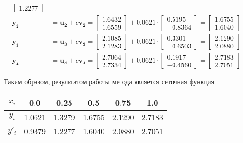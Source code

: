 \documentclass[a4paper, 12pt]{article}
\begin{document}
\begin{enumerate}
\begin{align*}
\begin{bmatrix}
					1.2277
				\end{bmatrix}\\
				\mathbf{y_2}&=\mathbf{u_2}+c\mathbf{v_2}=
				\begin{bmatrix}
					1.6432\\
					1.6559
				\end{bmatrix} + 0.0621 \cdot 
				\begin{bmatrix}
					0.5195\\
					-0.8364
				\end{bmatrix} = 
				\begin{bmatrix}
					1.6755\\
					1.6040
				\end{bmatrix}\\
				\mathbf{y_3}&=\mathbf{u_3}+c\mathbf{v_3}=
				\begin{bmatrix}
					2.1085\\
					2.1283
				\end{bmatrix} + 0.0621 \cdot 
				\begin{bmatrix}
					0.3301\\
					-0.6503
				\end{bmatrix} = 
				\begin{bmatrix}
					2.1290\\
					2.0880
				\end{bmatrix}\\
				\mathbf{y_4}&=\mathbf{u_4}+c\mathbf{v_4}=
				\begin{bmatrix}
					2.7064\\
					2.7334
				\end{bmatrix} + 0.0621 \cdot 
				\begin{bmatrix}
					0.1917\\
					-0.4560
				\end{bmatrix} = 
				\begin{bmatrix}
					2.7183\\
					2.7051
				\end{bmatrix}
			\end{align*}
	\end{enumerate} 
	
	Таким образом, результатом работы метода является сеточная функция
	\begin{center}
	\begin{tabular}{| c | c | c | c | c | c |}
		\hline
		$x_i$ & 0.0 & 0.25 & 0.5 & 0.75 & 1.0\\ \hline
		$y_i$ & 1.0621 & 1.3279 & 1.6755 & 2.1290 & 2.7183\\ \hline
		$y'_i$ & 0.9379 & 1.2277 & 1.6040 & 2.0880 & 2.7051\\ \hline
	\end{tabular}
	\end{center}
	
\end{document}
